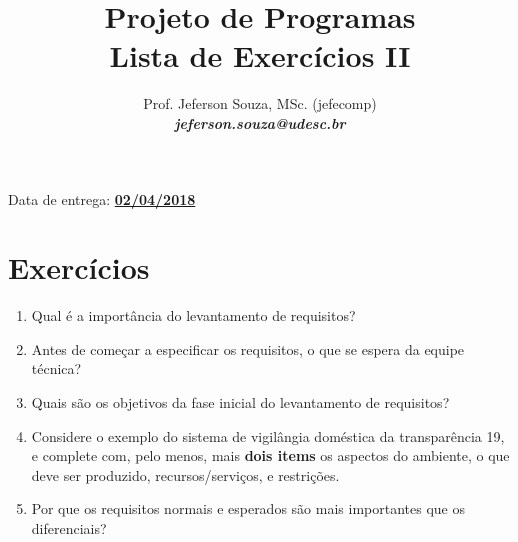\documentclass[12pt]{article}
\title{Projeto de Programas \\ Lista de Exercícios II}
\author{Prof. Jeferson Souza, MSc. (jefecomp) \\[3mm]
\textbf{\textit{jeferson.souza@udesc.br}}}
\date{}
\begin{document}
\maketitle

\centering Data de entrega: \textbf{\underline{02/04/2018}}

\section*{Exercícios}

\begin{enumerate}
\itemsep 10mm

\item Qual é a importância do levantamento de requisitos?

\item Antes de começar a especificar os requisitos, o que se espera da equipe técnica?

\item Quais são os objetivos da fase inicial do levantamento de requisitos?

\item Considere o exemplo do sistema de vigilângia doméstica da transparência 19, e complete com, pelo menos, mais \textbf{dois items} os aspectos do ambiente, o que deve ser produzido, recursos/serviços, e restrições.

\item Por que os requisitos normais e esperados são mais importantes que os diferenciais?

\end{enumerate}
\end{document}
